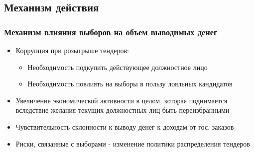 \subsection{Механизм действия}

\begin{frame}
\frametitle{Механизм влияния выборов на объем выводимых денег}
\begin{itemize}
\item Коррупция при розыгрыше тендеров:
	\begin{itemize}
	\item Необходимость подкупить действующее должностное лицо
	\item Необходимость повлиять на выборы в пользу лояльных кандидатов
	\end{itemize}

\item Увеличение экономической активности в целом, которая поднимается вследствие желания текущих должностных лиц быть переизбранными

\item Чувствительность склонности к выводу денег к доходам от гос. заказов

\item Риски, связанные с выборами - изменение политики распределения тендеров
\end{itemize}
\end{frame}

